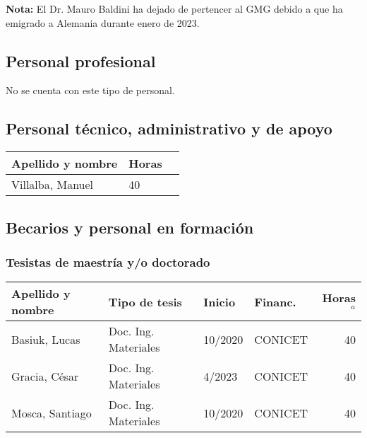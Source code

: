 \documentclass[a4paper,11pt,twoside,final,titlepage,onecolumn,openright]{report}
\begin{document}
\textbf{Nota:} El Dr. Mauro Baldini ha dejado de pertencer al GMG debido a que ha emigrado a Alemania durante enero de 2023.

\subsection{Personal profesional}
No se cuenta con este tipo de personal.



\subsection{Personal técnico, administrativo y de apoyo}

\begin{tabular}{l l r}
\toprule
Apellido y nombre & Horas \\
\midrule
 Villalba, Manuel &  40\\
 \bottomrule
 \end{tabular}

\subsection{Becarios y personal en formación}

\subsubsection{Tesistas de maestría y/o doctorado}
\begin{tabular}{l l l l r}
\toprule
Apellido y nombre & Tipo de tesis & Inicio & Financ. & Horas$^a$ \\
\midrule
Basiuk, Lucas & Doc. Ing. Materiales & 10/2020 &  CONICET & 40 \\
Gracia, César & Doc. Ing. Materiales & 4/2023 &  CONICET & 40 \\
Mosca, Santiago & Doc. Ing. Materiales & 10/2020 &  CONICET & 40\\
\bottomrule
\end{tabular}
\end{document}
